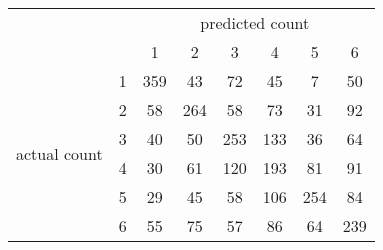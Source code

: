 
\begin{tabular}{*{8}{c}}
& & \multicolumn{6}{c}{predicted count} \\
& & 1 & 2 & 3 & 4 & 5 & 6 \\
\multirow{6}{*}{\begin{sideways}actual count\end{sideways}}
& 1 & \cellcolor[rgb]{0.000000,1.000000,0.000000}359 & \cellcolor[rgb]{0.975443,0.024557,0.000000}43 & \cellcolor[rgb]{0.841309,0.158691,0.000000}72 & \cellcolor[rgb]{0.971887,0.028113,0.000000}45 & \cellcolor[rgb]{0.997938,0.002062,0.000000}7 & \cellcolor[rgb]{0.960675,0.039325,0.000000}50 \\
& 2 & \cellcolor[rgb]{0.933406,0.066594,0.000000}58 & \cellcolor[rgb]{0.000009,0.999991,0.000000}264 & \cellcolor[rgb]{0.933406,0.066594,0.000000}58 & \cellcolor[rgb]{0.831816,0.168184,0.000000}73 & \cellcolor[rgb]{0.989177,0.010823,0.000000}31 & \cellcolor[rgb]{0.569328,0.430672,0.000000}92 \\
& 3 & \cellcolor[rgb]{0.979969,0.020031,0.000000}40 & \cellcolor[rgb]{0.960675,0.039325,0.000000}50 & \cellcolor[rgb]{0.000018,0.999982,0.000000}253 & \cellcolor[rgb]{0.071219,0.928781,0.000000}133 & \cellcolor[rgb]{0.984753,0.015247,0.000000}36 & \cellcolor[rgb]{0.902345,0.097655,0.000000}64 \\
& 4 & \cellcolor[rgb]{0.989896,0.010104,0.000000}30 & \cellcolor[rgb]{0.919227,0.080773,0.000000}61 & \cellcolor[rgb]{0.159047,0.840953,0.000000}120 & \cellcolor[rgb]{0.001187,0.998813,0.000000}193 & \cellcolor[rgb]{0.739428,0.260572,0.000000}81 & \cellcolor[rgb]{0.586267,0.413733,0.000000}91 \\
& 5 & \cellcolor[rgb]{0.990567,0.009433,0.000000}29 & \cellcolor[rgb]{0.971887,0.028113,0.000000}45 & \cellcolor[rgb]{0.933406,0.066594,0.000000}58 & \cellcolor[rgb]{0.333341,0.666659,0.000000}106 & \cellcolor[rgb]{0.000017,0.999983,0.000000}254 & \cellcolor[rgb]{0.697341,0.302659,0.000000}84 \\
& 6 & \cellcolor[rgb]{0.945244,0.054756,0.000000}55 & \cellcolor[rgb]{0.811482,0.188518,0.000000}75 & \cellcolor[rgb]{0.937595,0.062405,0.000000}57 & \cellcolor[rgb]{0.667251,0.332749,0.000000}86 & \cellcolor[rgb]{0.902345,0.097655,0.000000}64 & \cellcolor[rgb]{0.000049,0.999951,0.000000}239 \\
\end{tabular}
